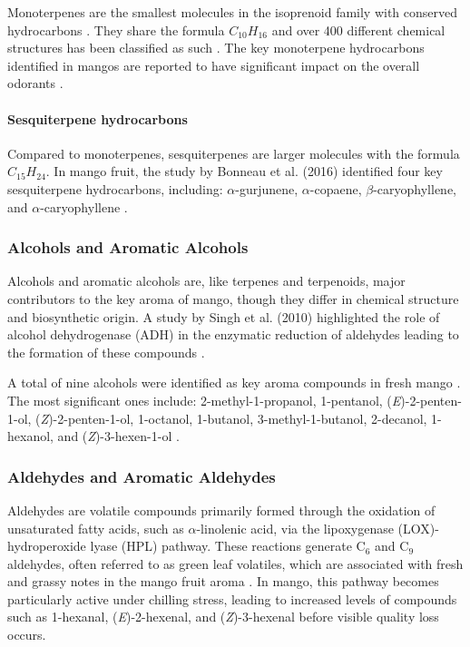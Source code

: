 Monoterpenes are the smallest molecules in the isoprenoid family with conserved hydrocarbons \cite*{A09_Barras2024}. They share the formula $C_{10}H_{16}$ and over 400 different chemical structures has been classified as such \cite*{A09_Barras2024}. The key monoterpene hydrocarbons identified in mangos are reported to have significant impact on the overall odorants \cite*{A07_Bonneau2016}.

\paragraph*{Sesquiterpene hydrocarbons}
Compared to monoterpenes, sesquiterpenes are larger molecules with the formula $C_{15}H_{24}$. In mango fruit, the study by Bonneau et al. (2016) identified four key sesquiterpene hydrocarbons, including: $\alpha$-gurjunene, $\alpha$-copaene, $\beta$-caryophyllene, and $\alpha$-caryophyllene \cite*{A07_Bonneau2016}.

\subsubsection*{Alcohols and Aromatic Alcohols}
Alcohols and aromatic alcohols are, like terpenes and terpenoids, major contributors to the key aroma of mango, though they differ in chemical structure and biosynthetic origin. A study by Singh et al. (2010) highlighted the role of alcohol dehydrogenase (ADH) in the enzymatic reduction of aldehydes leading to the formation of these compounds \cite*{A10_Singh2010}.

\vspace{1em}
A total of nine alcohols were identified as key aroma compounds in fresh mango \cite*{A07_Bonneau2016}. The most significant ones include: 2-methyl-1-propanol, 1-pentanol, (\textit{E})-2-penten-1-ol, (\textit{Z})-2-penten-1-ol, 1-octanol, 1-butanol, 3-methyl-1-butanol, 2-decanol, 1-hexanol, and (\textit{Z})-3-hexen-1-ol \cite*{A07_Bonneau2016}.

\subsubsection*{Aldehydes and Aromatic Aldehydes}
Aldehydes are volatile compounds primarily formed through the oxidation of unsaturated fatty acids, such as $\alpha$-linolenic acid, via the lipoxygenase (LOX)-hydroperoxide lyase (HPL) pathway. These reactions generate C$_6$ and C$_9$ aldehydes, often referred to as green leaf volatiles, which are associated with fresh and grassy notes in the mango fruit aroma \cite*{A11_Sivankalyani2017}. In mango, this pathway becomes particularly active under chilling stress, leading to increased levels of compounds such as 1-hexanal, (\textit{E})-2-hexenal, and (\textit{Z})-3-hexenal before visible quality loss occurs.

